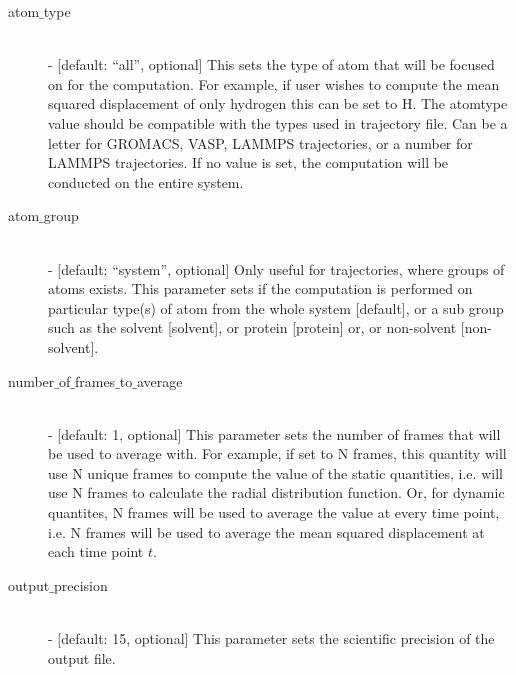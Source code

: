 \documentclass{article}
\begin{document}
\begin{description}
	\item[atom$\_$type] \hfill \\
	- [default: ``all'', optional]  This sets the type of atom that will be focused on for the computation.  For example, if user wishes to compute the mean squared displacement of only hydrogen this can be set to H.   The atomtype value should be compatible with the types used in trajectory file. Can be a letter for GROMACS,  VASP,  LAMMPS trajectories, or a number for LAMMPS trajectories.  If no value is set, the computation will be conducted on the entire system.
	
	\item[atom$\_$group] \hfill \\
	- [default: ``system'', optional]  Only useful for trajectories, where groups of atoms exists.  This parameter sets if the computation is performed on particular type(s) of atom from the whole system [default], or a sub group such as the solvent [solvent], or protein [protein] or, or non-solvent [non-solvent].
	
	\item[number$\_$of$\_$frames$\_$to$\_$average] \hfill \\
	- [default: 1, optional] This parameter sets the number of frames that will be used to average with.  For example, if set to N frames, this quantity will use N unique frames to compute the value of the static quantities, i.e. will use N frames to calculate the radial distribution function.  Or, for dynamic quantites, N frames will be used to average the value at every time point, i.e. N frames will be used to average the mean squared displacement at each time point $t$.
	
	\item[output$\_$precision] \hfill \\
	- [default: 15, optional] This parameter sets the scientific precision of the output file.
	
	
\end{description}
\end{document}
